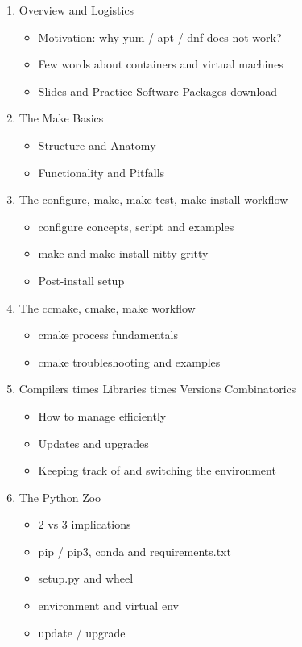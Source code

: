 \documentclass{report}
\begin{document}
\begin{enumerate}
\item Overview and Logistics
  \begin{itemize}
    \item Motivation: why yum / apt / dnf does not work? 
    \item Few words about containers and virtual machines
    \item Slides and Practice Software Packages download
  \end{itemize}
\item The Make Basics
  \begin{itemize}
    \item Structure and Anatomy
    \item Functionality and Pitfalls
  \end{itemize}
\item The configure, make, make test, make install workflow
  \begin{itemize}
    \item configure concepts, script and examples
    \item make and make install nitty-gritty
    \item Post-install setup
  \end{itemize}
\item The ccmake, cmake, make workflow
    \begin{itemize}
      \item cmake process fundamentals
      \item cmake troubleshooting and examples
    \end{itemize}
\item Compilers times Libraries times Versions Combinatorics
  \begin{itemize}
    \item How to manage efficiently
    \item Updates and upgrades
    \item Keeping track of and switching the environment
  \end{itemize}
\item The Python Zoo
  \begin{itemize}
    \item 2 vs 3 implications
    \item pip / pip3, conda and requirements.txt
    \item setup.py and wheel
    \item environment and virtual env
    \item update / upgrade

\end{itemize}
\end{enumerate}
\end{document}
